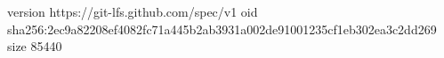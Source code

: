 version https://git-lfs.github.com/spec/v1
oid sha256:2ec9a82208ef4082fc71a445b2ab3931a002de91001235cf1eb302ea3c2dd269
size 85440
